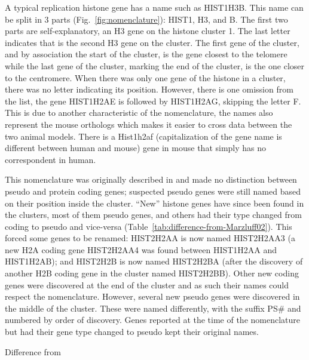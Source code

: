 \documentclass[10pt,a4paper,draft,article]{memoir}
\begin{document}
      A typical replication histone gene has a name such as HIST1H3B. This name can be split in
      3 parts (Fig.~\ref{fig:nomenclature}): HIST1, H3, and B. The first two parts are self-explanatory,
      an H3 gene on the histone cluster 1. The last letter indicates that is the second H3 gene on the cluster.
      The first gene of the cluster, and by association the start of the cluster, is the gene closest to the telomere
      while the last gene of the cluster, marking the end of the cluster, is the one closer to the centromere. When
      there was only one gene of the histone in a cluster, there was no letter indicating its position. However, there is
      one omission from the list, the gene HIST1H2AE is followed by HIST1H2AG, skipping the letter F. This is due
      to another characteristic of the nomenclature, the names also represent the mouse orthologs which makes it easier
      to cross data between the two animal models. There is a Hist1h2af (capitalization
      of the gene name is different between human and mouse) gene in mouse that simply has no correspondent in human.

      This nomenclature was originally described in \cite{Marzluff02} and made no distinction between
      pseudo and protein coding genes; suspected pseudo genes were still named based on their position
      inside the cluster. ``New'' histone genes have since been found in the clusters,
      most of them pseudo genes, and others had their type changed from coding to pseudo and
      vice-versa (Table~\ref{tab:difference-from-Marzluff02}).
      This forced some genes to be renamed: HIST2H2AA is now named HIST2H2AA3 (a new H2A coding gene
      HIST2H2AA4 was found between HIST1H2AA and HIST1H2AB);
      and HIST2H2B is now named HIST2H2BA (after the discovery of another H2B coding gene in the
      cluster named HIST2H2BB).
      Other new coding genes were discovered at the end of the cluster and as such their names could respect the nomenclature. However,
      several new pseudo genes were discovered in the middle of the cluster. These were named differently, with the suffix PS\#
      and numbered by order of discovery. Genes reported at the time of the nomenclature but had their gene type changed to pseudo
      kept their original names.

      \begin{table}
        \centering
        
        \caption{Difference from \cite{Marzluff02}}
        \label{tab:difference-from-Marzluff02}
      \end{table}
\end{document}
